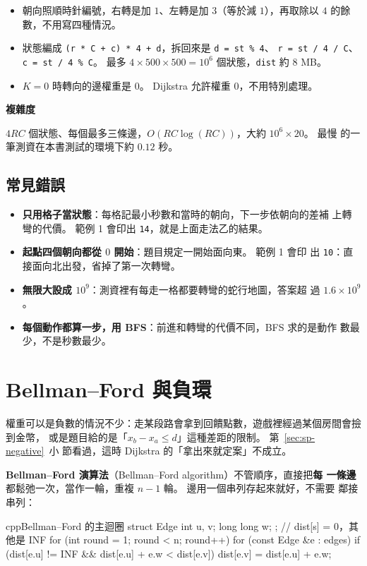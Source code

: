 \begin{itemize}
\item 朝向照順時針編號，右轉是加 $1$、左轉是加 $3$（等於減 $1$），再取除以
$4$ 的餘數，不用寫四種情況。
\item 狀態編成 \texttt{(r * C + c) * 4 + d}，拆回來是 \texttt{d = st \% 4}、
\texttt{r = st / 4 / C}、\texttt{c = st / 4 \% C}。 最多 $4 \times 500 \times
500 = 10^6$ 個狀態，\texttt{dist} 約 8 MB。
\item $K = 0$ 時轉向的邊權重是 $0$。 Dijkstra 允許權重 $0$，不用特別處理。
\end{itemize}

\textbf{複雜度}

$4RC$ 個狀態、每個最多三條邊，$O(RC \log(RC))$，大約 $10^6 \times 20$。 最慢
的一筆測資在本書測試的環境下約 $0.12$ 秒。

\subsection{常見錯誤}

\begin{itemize}
\item \textbf{只用格子當狀態}：每格記最小秒數和當時的朝向，下一步依朝向的差補
上轉彎的代價。 範例 1 會印出 \texttt{14}，就是上面走法乙的結果。
\item \textbf{起點四個朝向都從 $0$ 開始}：題目規定一開始面向東。 範例 1 會印
出 \texttt{10}：直接面向北出發，省掉了第一次轉彎。
\item \textbf{無限大設成 $10^9$}：測資裡有每走一格都要轉彎的蛇行地圖，答案超
過 $1.6 \times 10^9$。
\item \textbf{每個動作都算一步，用 BFS}：前進和轉彎的代價不同，BFS 求的是動作
數最少，不是秒數最少。
\end{itemize}

\section{Bellman--Ford 與負環}
\label{sec:sp-bf}

權重可以是負數的情況不少：走某段路會拿到回饋點數，遊戲裡經過某個房間會撿到金幣，
或是題目給的是「$x_b - x_a \le d$」這種差距的限制。 第~\ref{sec:sp-negative}~小
節看過，這時 Dijkstra 的「拿出來就定案」不成立。

\textbf{Bellman--Ford 演算法}（Bellman--Ford algorithm）不管順序，直接把\textbf{每
一條邊}都鬆弛一次，當作一輪，重複 $n - 1$ 輪。 邊用一個串列存起來就好，不需要
鄰接串列：

\begin{code}{cpp}{Bellman--Ford 的主迴圈}
struct Edge {
    int u, v;
    long long w;
};
// dist[s] = 0，其他是 INF
for (int round = 1; round < n; round++) {
    for (const Edge &e : edges) {
        if (dist[e.u] != INF && dist[e.u] + e.w < dist[e.v]) {
            dist[e.v] = dist[e.u] + e.w;
        }
    }
}
\end{code}

